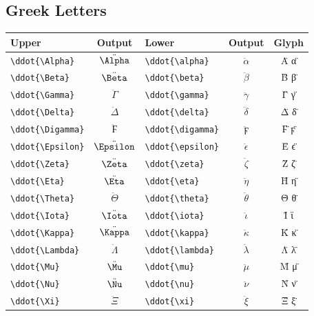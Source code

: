\documentclass[12pt,a4paper]{article}
\begin{document}
\subsection*{Greek Letters}
\begin{longtable}{|l|c|l|c|c|}
\hline
\textbf{Upper}            & \textbf{Output}   & \textbf{Lower}            & \textbf{Output}      & \textbf{Glyph} \\
\hline
\verb|\ddot{\Alpha}|      & $\ddot{\Alpha}$   & \verb|\ddot{\alpha}|      & $\ddot{\alpha}$      & Α̈ α̈ \\
\verb|\ddot{\Beta}|       & $\ddot{\Beta}$    & \verb|\ddot{\beta}|       & $\ddot{\beta}$       & Β̈ β̈ \\
\verb|\ddot{\Gamma}|      & $\ddot{\Gamma}$   & \verb|\ddot{\gamma}|      & $\ddot{\gamma}$      & Γ̈ γ̈ \\
\verb|\ddot{\Delta}|      & $\ddot{\Delta}$   & \verb|\ddot{\delta}|      & $\ddot{\delta}$      & Δ̈ δ̈ \\
\verb|\ddot{\Digamma}|    & $\ddot{\Digamma}$ & \verb|\ddot{\digamma}|    & $\ddot{\digamma}$    & Ϝ̈ ϝ̈ \\
\verb|\ddot{\Epsilon}|    & $\ddot{\Epsilon}$ & \verb|\ddot{\epsilon}|    & $\ddot{\epsilon}$    & Ε̈ ϵ̈ \\
\verb|\ddot{\Zeta}|       & $\ddot{\Zeta}$    & \verb|\ddot{\zeta}|       & $\ddot{\zeta}$       & Ζ̈ ζ̈ \\
\verb|\ddot{\Eta}|        & $\ddot{\Eta}$     & \verb|\ddot{\eta}|        & $\ddot{\eta}$        & Η̈ η̈ \\
\verb|\ddot{\Theta}|      & $\ddot{\Theta}$   & \verb|\ddot{\theta}|      & $\ddot{\theta}$      & Θ̈ θ̈ \\
\verb|\ddot{\Iota}|       & $\ddot{\Iota}$    & \verb|\ddot{\iota}|       & $\ddot{\iota}$       & Ϊ ϊ \\
\verb|\ddot{\Kappa}|      & $\ddot{\Kappa}$   & \verb|\ddot{\kappa}|      & $\ddot{\kappa}$      & Κ̈ κ̈ \\
\verb|\ddot{\Lambda}|     & $\ddot{\Lambda}$  & \verb|\ddot{\lambda}|     & $\ddot{\lambda}$     & Λ̈ λ̈ \\
\verb|\ddot{\Mu}|         & $\ddot{\Mu}$      & \verb|\ddot{\mu}|         & $\ddot{\mu}$         & Μ̈ μ̈ \\
\verb|\ddot{\Nu}|         & $\ddot{\Nu}$      & \verb|\ddot{\nu}|         & $\ddot{\nu}$         & Ν̈ ν̈ \\
\verb|\ddot{\Xi}|         & $\ddot{\Xi}$      & \verb|\ddot{\xi}|         & $\ddot{\xi}$         & Ξ̈ ξ̈ \\

\end{longtable}
\end{document}
